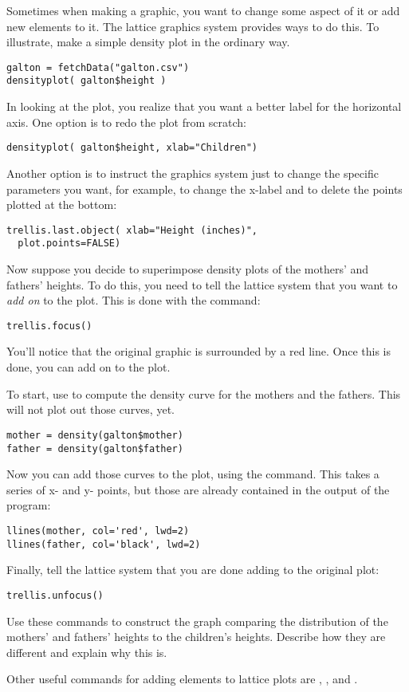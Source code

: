 
Sometimes when making a graphic, you want to change some aspect of it
or add new elements to it.  The lattice graphics system provides ways
to do this.  To illustrate, make a simple density plot in the ordinary
way.  
\begin{verbatim}
galton = fetchData("galton.csv")
densityplot( galton$height )
\end{verbatim}

In looking at the plot, you realize that you want a better label for
the horizontal axis.  One option is to redo the plot from scratch:
\begin{verbatim}
densityplot( galton$height, xlab="Children")
\end{verbatim}
Another option is to instruct the graphics system just to change the
specific parameters you want, for example, to change the x-label and
to delete the points plotted at the bottom:
\begin{verbatim}
trellis.last.object( xlab="Height (inches)", 
  plot.points=FALSE)
\end{verbatim}

Now suppose you decide to superimpose density plots of the mothers' and
fathers' heights.  To do this, you need to tell the lattice system
that you want to {\em add on} to the plot.  This is done with the
 command:
\begin{verbatim}
trellis.focus()
\end{verbatim}
You'll notice that the original graphic is surrounded by a red line.
Once this is done, you can add on to the plot.  

To start, use  to compute the density curve for the
mothers and the fathers.  This will not plot out those curves, yet.
\begin{verbatim}
mother = density(galton$mother)
father = density(galton$father)
\end{verbatim}

Now you can add those curves to the plot, using the 
command.  This takes a series of x- and y- points, but those are
already contained in the output of the  program:
\begin{verbatim}
llines(mother, col='red', lwd=2)
llines(father, col='black', lwd=2)
\end{verbatim}

Finally, tell the lattice system that you are done adding to the
original plot:
\begin{verbatim}
trellis.unfocus()
\end{verbatim}

Use these commands to construct the graph comparing the distribution
of the mothers' and
fathers' heights to the children's heights.  Describe how they are
different and explain why this is. \TextEntry

Other useful commands for adding elements to lattice plots are
, , and .